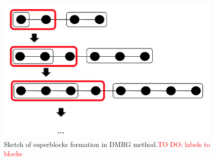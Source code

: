 \begin{figure}[H]
    \centering
    \includegraphics[scale=0.5]{Figures/dmrg_superblock_sketch.png}
    \captionsetup{width=1.\linewidth}
    \caption{Sketch of superblocks formation in DMRG method.\textcolor{red}{TO DO: labels to blocks} %
    }
    \label{fig:DMRG_superblockSketch}
\end{figure}

